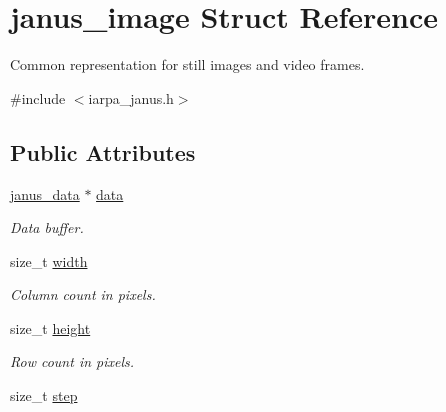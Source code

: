 \hypertarget{structjanus__image}{}\section{janus\+\_\+image Struct Reference}
\label{structjanus__image}


Common representation for still images and video frames.  




{\ttfamily \#include $<$iarpa\+\_\+janus.\+h$>$}

\subsection*{Public Attributes}
\begin{DoxyCompactItemize}
\item 
\hypertarget{structjanus__image_a1fa7b90cbbc4955d3cbef522000367ff}{}\hyperlink{group__janus_gab23d3331754844d0a5e80fcfad4d32c0}{janus\+\_\+data} $\ast$ \hyperlink{structjanus__image_a1fa7b90cbbc4955d3cbef522000367ff}{data}\label{structjanus__image_a1fa7b90cbbc4955d3cbef522000367ff}

\begin{DoxyCompactList}\small\item\em Data buffer. \end{DoxyCompactList}\item 
\hypertarget{structjanus__image_a3f91ac2ebfdc24834b1e4c1148fe4878}{}size\+\_\+t \hyperlink{structjanus__image_a3f91ac2ebfdc24834b1e4c1148fe4878}{width}\label{structjanus__image_a3f91ac2ebfdc24834b1e4c1148fe4878}

\begin{DoxyCompactList}\small\item\em Column count in pixels. \end{DoxyCompactList}\item 
\hypertarget{structjanus__image_ad1e37bdcfd132c6b72ceb6c1de874f66}{}size\+\_\+t \hyperlink{structjanus__image_ad1e37bdcfd132c6b72ceb6c1de874f66}{height}\label{structjanus__image_ad1e37bdcfd132c6b72ceb6c1de874f66}

\begin{DoxyCompactList}\small\item\em Row count in pixels. \end{DoxyCompactList}\item 
\hypertarget{structjanus__image_a9faafa4355e93b69a7397696596e7c51}{}size\+\_\+t \hyperlink{structjanus__image_a9faafa4355e93b69a7397696596e7c51}{step}\label{structjanus__image_a9faafa4355e93b69a7397696596e7c51}


\end{DoxyCompactItemize}
